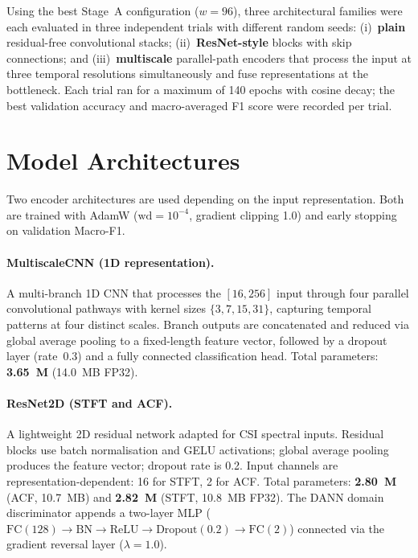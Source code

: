 \documentclass[english,bibtex]{kththesis}
\begin{document}
Using the best Stage~A configuration ($w = 96$), three architectural families were each evaluated in three independent trials with different random seeds: (i)~\textbf{plain} residual-free convolutional stacks; (ii)~\textbf{ResNet-style} blocks with skip connections; and (iii)~\textbf{multiscale} parallel-path encoders that process the input at three temporal resolutions simultaneously and fuse representations at the bottleneck. Each trial ran for a maximum of 140 epochs with cosine decay; the best validation accuracy and macro-averaged F1 score were recorded per trial.

\section{Model Architectures}
\label{sec:model_architectures}

Two encoder architectures are used depending on the input representation. Both are trained with AdamW ($\mathrm{wd} = 10^{-4}$, gradient clipping 1.0) and early stopping on validation Macro-F1.

\paragraph{MultiscaleCNN (1D representation).}
A multi-branch 1D CNN that processes the $[16, 256]$ input through four parallel convolutional pathways with kernel sizes $\{3, 7, 15, 31\}$, capturing temporal patterns at four distinct scales. Branch outputs are concatenated and reduced via global average pooling to a fixed-length feature vector, followed by a dropout layer (rate~0.3) and a fully connected classification head. Total parameters: \textbf{3.65~M} (14.0~MB FP32).

\paragraph{ResNet2D (STFT and ACF).}
A lightweight 2D residual network adapted for CSI spectral inputs. Residual blocks use batch normalisation and GELU activations; global average pooling produces the feature vector; dropout rate is 0.2. Input channels are representation-dependent: 16 for STFT, 2 for ACF. Total parameters: \textbf{2.80~M} (ACF, 10.7~MB) and \textbf{2.82~M} (STFT, 10.8~MB FP32). The DANN domain discriminator appends a two-layer MLP ($\mathrm{FC}(128) \to \mathrm{BN} \to \mathrm{ReLU} \to \mathrm{Dropout}(0.2) \to \mathrm{FC}(2)$) connected via the gradient reversal layer ($\lambda = 1.0$).
\end{document}
